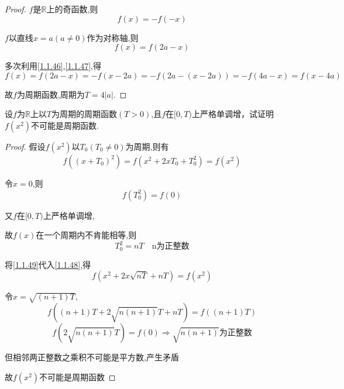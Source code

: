 \begin{proof}

    $f$是$\mathbb{R}$上的奇函数,则
    \begin{equation}
        f(x)=-f(-x) \label{1.1.46}
    \end{equation}

    $f$以直线$x=a(a\ne 0)$作为对称轴,则
    \begin{equation}
        f(x)=f(2a-x)    \label{1.1.47}
    \end{equation}

    多次利用\cref{1.1.46},\cref{1.1.47},得
    \begin{equation*}
        f(x)=f(2a-x)=-f(x-2a)=-f(2a-(x-2a))=-f(4a-x)=f(x-4a)
    \end{equation*}
    
    故$f$为周期函数,周期为$T=4|a|$. 
\end{proof}

\vspace{5pt}
\begin{exercise}
    设$f$为$\mathbb{R}$上以$T$为周期的周期函数$(T>0)$,且$f$在$[0,T)$上严格单调增，试证明$f(x^2)$不可能是周期函数. 
\end{exercise}

\begin{proof}

    假设$f(x^2)$以$T_0(T_0\ne 0)$为周期,则有
    \begin{equation}
        f((x+T_0)^2)=f(x^2+2xT_0+T_0^2)=f(x^2)  \label{1.1.48}
    \end{equation}

    令$x=0$,则
    \begin{equation*}
        f(T_0^2)=f(0)
    \end{equation*}

    又$f$在$[0,T)$上严格单调增,

    故$f(x)$在一个周期内不肯能相等,则
    \begin{equation}
        T_0^2=nT \quad \mbox{n为正整数} \label{1.1.49}
    \end{equation}

    将\cref{1.1.49}代入\cref{1.1.48},得
    \begin{equation*}
        f(x^2+2x\sqrt{nT}+nT)=f(x^2)
    \end{equation*}

    令$x=\sqrt{(n+1)T}$,
    \begin{equation*}
        f((n+1)T+2\sqrt{n(n+1)}T+nT)=f((n+1)T)
    \end{equation*}
    \begin{equation*}
        f(2\sqrt{n(n+1)}T)=f(0)\Longrightarrow \sqrt{n(n+1)}\mbox{为正整数}
    \end{equation*}

    但相邻两正整数之乘积不可能是平方数,产生矛盾

    故$f(x^2)$不可能是周期函数
\end{proof}

